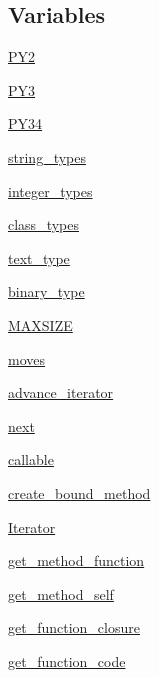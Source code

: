 \subsection*{Variables}
\begin{DoxyCompactItemize}
\item 
\hyperlink{namespacesix_aae353bc6b7f49f063f3df663b51bdc64}{P\+Y2}
\item 
\hyperlink{namespacesix_a0604d9501f588d59f1da389f5b47b7ff}{P\+Y3}
\item 
\hyperlink{namespacesix_ab1c2d3ed760139f44def61160d30871f}{P\+Y34}
\item 
\hyperlink{namespacesix_ad355223ed31cca422c1c6261935f00b6}{string\+\_\+types}
\item 
\hyperlink{namespacesix_ab69ddf0a905ac83ca102d33638afe92b}{integer\+\_\+types}
\item 
\hyperlink{namespacesix_ac5a606fbb1fa94808d47fcf0da36f79e}{class\+\_\+types}
\item 
\hyperlink{namespacesix_ace0291fdfa94c168df97653542f18304}{text\+\_\+type}
\item 
\hyperlink{namespacesix_a9063602f8023da63466adbe85113e7e7}{binary\+\_\+type}
\item 
\hyperlink{namespacesix_a5c1f05855af95282335ce3d3780d21bb}{M\+A\+X\+S\+I\+ZE}
\item 
\hyperlink{namespacesix_aeef5acf662d9f0ffb5b058ee5eff9acd}{moves}
\item 
\hyperlink{namespacesix_a54297b1c9588655ddadf0bd50b85caaa}{advance\+\_\+iterator}
\item 
\hyperlink{namespacesix_ac38b4dddeaa6855982abf2a54397de47}{next}
\item 
\hyperlink{namespacesix_ae1fc3ab5b1e4002198efdf53f7d106be}{callable}
\item 
\hyperlink{namespacesix_a25755bd7c68858d48bdb7fe83a12deaf}{create\+\_\+bound\+\_\+method}
\item 
\hyperlink{namespacesix_a112d5ae62d2f7a5dd5ef73475f42ba64}{Iterator}
\item 
\hyperlink{namespacesix_a831039d464e495518c83fe04858b6d47}{get\+\_\+method\+\_\+function}
\item 
\hyperlink{namespacesix_a6a40a9da07a39cdb9b795dbfd6c5df9b}{get\+\_\+method\+\_\+self}
\item 
\hyperlink{namespacesix_a47a45665657a954b28c890018dbc4caf}{get\+\_\+function\+\_\+closure}
\item 
\hyperlink{namespacesix_a17cf3556b07a902733cf8694ccc8c620}{get\+\_\+function\+\_\+code}

\end{DoxyCompactItemize}
